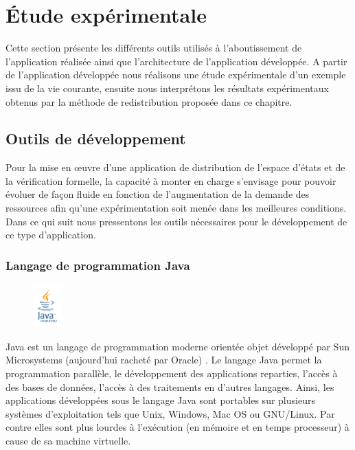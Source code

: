 \section{Étude expérimentale}
Cette section présente les différents outils utilisés à l'aboutissement de l'application réalisée ainsi que l'architecture de l'application développée.
A partir de l'application développée nous réalisons une étude expérimentale d'un exemple issu de la vie courante, ensuite nous interprétons les résultats expérimentaux obtenus par la méthode de redistribution proposée dans ce chapitre.

\subsection{Outils de développement}
Pour la mise en œuvre d’une application de distribution de l'espace d'états et de la vérification formelle, la capacité à monter en charge s’envisage pour pouvoir évoluer de façon fluide en fonction de l'augmentation de la demande des ressources afin qu'une expérimentation soit menée dans les meilleures conditions. Dans ce qui suit nous pressentons les outils nécessaires pour le développement de ce type d'application. \newpage

\subsubsection*{Langage de programmation Java}
\begin{figure}
	\vspace{-60pt}
	\begin{center}
		\includegraphics[width=0.1\textwidth]{img/java}
	\end{center} 
	\vspace{-20pt}
	\vspace{-10pt} 
\end{figure}
Java est un langage de programmation moderne orientée objet développé par Sun Microsystems (aujourd'hui racheté par Oracle) \citep{java}. Le langage Java permet la programmation parallèle, le développement des applications reparties, l'accès à des bases de données, l'accès à des traitements en d'autres langages. Ainsi, les applications développées sous le langage  Java sont portables sur plusieurs systèmes d’exploitation tels que Unix, Windows, Mac OS ou GNU/Linux. Par contre elles sont plus lourdes à l'exécution (en mémoire et en temps processeur) à cause de sa machine virtuelle.
